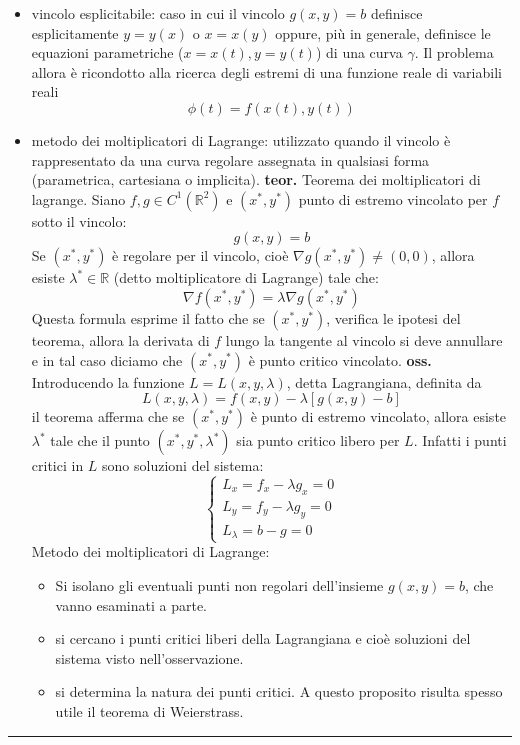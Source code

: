 \begin{itemize}
    \item vincolo esplicitabile: caso in cui il vincolo $g(x,y) = b$ definisce esplicitamente $y=y(x)$ o $x = x(y)$ oppure, più in generale, definisce le equazioni parametriche ($x= x(t), y = y(t)$) di una curva $\gamma$. Il problema allora è ricondotto alla ricerca degli estremi di una funzione reale di variabili reali
    \[
        \phi(t) = f(x(t), y(t))
    \]
    \item metodo dei moltiplicatori di Lagrange: utilizzato quando il vincolo è rappresentato da una curva regolare assegnata in qualsiasi forma (parametrica, cartesiana o implicita).\newline
    \textbf{teor.} Teorema dei moltiplicatori di lagrange. Siano $f,g \in C^1(\mathbb{R}^2)$ e $(x^*, y^*)$ punto di estremo vincolato per $f$ sotto il vincolo:
    \[
        g(x,y) = b
    \]
    Se $(x^*, y^*)$ è regolare per il vincolo, cioè $\nabla g(x^*, y^*) \neq (0,0)$, allora esiste $\lambda^* \in \mathbb{R}$ (detto moltiplicatore di Lagrange) tale che:
    \[
        \nabla f(x^*, y^*) = \lambda \nabla g(x^*, y^*)
    \]
    Questa formula esprime il fatto che se $(x^*, y^*)$, verifica le ipotesi del teorema, allora la derivata di $f$ lungo la tangente al vincolo si deve annullare e in tal caso diciamo che $(x^*, y^*)$ è punto critico vincolato.\newline
    \textbf{oss.} Introducendo la funzione $L = L (x, y , \lambda)$, detta Lagrangiana, definita da
    \[
        L(x,y,\lambda) = f(x,y) - \lambda[g(x,y) - b]
    \] 
    il teorema afferma che se $(x^*, y^*)$ è punto di estremo vincolato, allora esiste $\lambda^*$ tale che il punto $(x^*, y^*, \lambda^*)$ sia punto critico libero per $L$. Infatti i punti critici in $L$ sono soluzioni del sistema:
    \[
        \begin{cases}
            L_x = f_x - \lambda g_x  = 0\\
            L_y = f_y - \lambda g_y = 0\\
            L_\lambda = b-g = 0
        \end{cases}
    \]
    Metodo dei moltiplicatori di Lagrange:
    \begin{itemize}
        \item Si isolano gli eventuali punti non regolari dell'insieme $g(x,y) = b$, che vanno esaminati a parte.
        \item si cercano i punti critici liberi della Lagrangiana e cioè soluzioni del sistema visto nell'osservazione.
        \item si determina la natura dei punti critici. A questo proposito risulta spesso utile il teorema di Weierstrass.
    \end{itemize}
\end{itemize}
\rule{\textwidth}{0,4pt}
